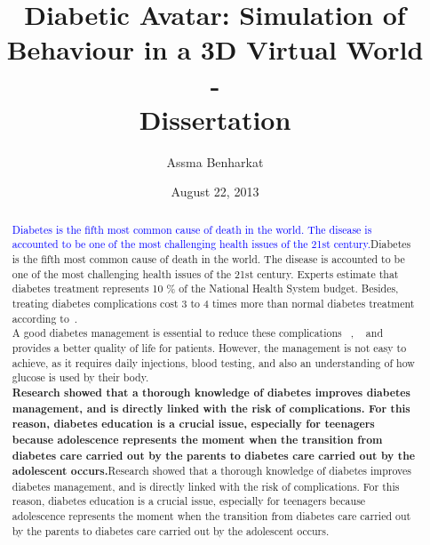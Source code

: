 \documentclass[12pt,MSc]{muthesis}
\title{Diabetic Avatar: Simulation of Behaviour in a 3D Virtual World \\-\\ Dissertation}
\author{Assma Benharkat}
\date{August 22,  2013}
\newcommand{\warn}[1]{\ifdefined\debug\textbf{#1}\else#1\fi}
\newcommand{\benfac}[1]{\ifdefined\debug\textcolor{blue}{#1}\else#1\fi}
\begin{document}
%



\maketitle
   \begin{abstract}

\benfac{Diabetes is the fifth most common cause of death in the world. The disease is accounted to be one of the most challenging health issues of the 21st century.}  
Experts estimate that diabetes treatment represents 10 \% of the National Health System budget. Besides, 
treating diabetes complications cost 3 to 4 times more than normal diabetes treatment according to~\cite{kanavos2012diabetes}. %
\\A good diabetes management is essential to reduce these complications ~\cite{complications1993QuasiCours}, ~\cite{nathan2005intensive}
and provides a better quality of life for patients. However, the management is not easy to achieve, as it requires daily injections, blood testing, and also an understanding of how glucose is used by their body.\\ \warn{Research showed that a thorough knowledge of diabetes improves diabetes management, and is directly linked with the risk of complications. For this reason, diabetes education is a crucial issue, especially for teenagers because adolescence represents the moment when the transition from diabetes care carried out by the parents to diabetes care carried out by the adolescent occurs.}\\

\end{abstract}
\end{document}
